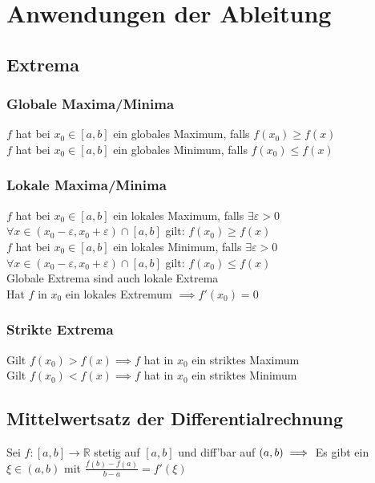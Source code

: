 \documentclass[a4paper,9pt]{extarticle}
\begin{document}
	\section*{Anwendungen der Ableitung}
	\subsection*{Extrema}
	\subsubsection*{Globale Maxima/Minima}
	$f$ hat bei $x_0 \in [a,b]$ ein globales Maximum, falls $f(x_0) ≥ f(x)$\\	
	$f$ hat bei $x_0 \in [a,b]$ ein globales Minimum, falls $f(x_0) ≤ f(x)$\\
	
	\subsubsection*{Lokale Maxima/Minima}
	$f$ hat bei $x_0 \in [a,b]$ ein lokales Maximum, falls $\exists \varepsilon > 0$ $\forall x \in (x_0 - \varepsilon, x_0 + \varepsilon) \cap [a,b]$ gilt: $f(x_0) ≥ f(x)$ \\
	
	$f$ hat bei $x_0 \in [a,b]$ ein lokales Minimum, falls $\exists \varepsilon > 0$ $\forall x \in (x_0 - \varepsilon, x_0 + \varepsilon) \cap [a,b]$ gilt: $f(x_0) ≤ f(x)$ \\
	
	Globale Extrema sind auch lokale Extrema \\
	
	Hat $f$ in $x_0$ ein lokales Extremum $\implies f'(x_0) = 0$
	
	\subsubsection*{Strikte Extrema}
	Gilt $f(x_0) > f(x) \implies f$ hat in $x_0$ ein striktes Maximum \\
	Gilt $f(x_0) < f(x) \implies f$ hat in $x_0$ ein striktes Minimum \\
		
	\subsection*{Mittelwertsatz der Differentialrechnung}
	Sei $f : [a,b] → \mathbb{R}$ stetig auf $[a,b]$ und diff'bar auf $(a,b) \\
	\implies$ Es gibt ein $\xi \in (a,b)$ mit $\frac{f(b) - f(a)}{b - a} = f'(\xi)$ \\
	
\end{document}
